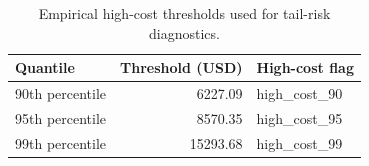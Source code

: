 \begin{table}
\caption{Empirical high-cost thresholds used for tail-risk diagnostics.}
\label{tab:02-high-cost-thresholds}
\begin{tabular}{lrl}
\toprule
Quantile & Threshold (USD) & High-cost flag \\
\midrule
90th percentile & 6227.09 & high_cost_90 \\
95th percentile & 8570.35 & high_cost_95 \\
99th percentile & 15293.68 & high_cost_99 \\
\bottomrule
\end{tabular}
\end{table}
